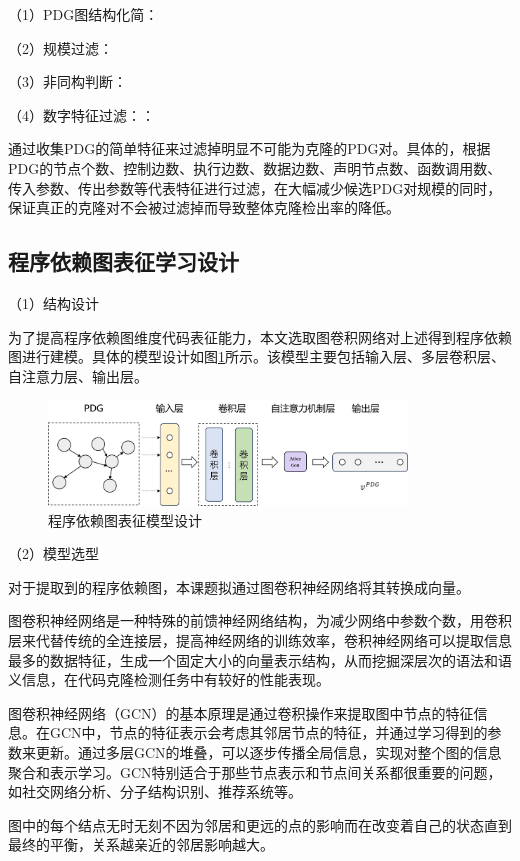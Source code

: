 （1）PDG图结构化简：

（2）规模过滤：

（3）非同构判断：

（4）数字特征过滤：：


通过收集PDG的简单特征来过滤掉明显不可能为克隆的PDG对。具体的，根据PDG的节点个数、控制边数、执行边数、数据边数、声明节点数、函数调用数、传入参数、传出参数等代表特征进行过滤，在大幅减少候选PDG对规模的同时，保证真正的克隆对不会被过滤掉而导致整体克隆检出率的降低。


\subsection{程序依赖图表征学习设计}
\label{subsec:PDGModel}

（1）结构设计

为了提高程序依赖图维度代码表征能力，本文选取图卷积网络对上述得到程序依赖图进行建模。具体的模型设计如图\ref{fig:pdgmodel}所示。该模型主要包括输入层、多层卷积层、自注意力层、输出层。
\begin{figure}[H]
  \centering
  \includegraphics[width=0.85\textwidth]{figures/pdgmodel.png}
  \caption{程序依赖图表征模型设计}\label{fig:pdgmodel}
\end{figure}

（2）模型选型


对于提取到的程序依赖图，本课题拟通过图卷积神经网络将其转换成向量。


图卷积神经网络是一种特殊的前馈神经网络结构，为减少网络中参数个数，用卷积层来代替传统的全连接层，提高神经网络的训练效率，卷积神经网络可以提取信息最多的数据特征，生成一个固定大小的向量表示结构，从而挖掘深层次的语法和语义信息，在代码克隆检测任务中有较好的性能表现。

图卷积神经网络（GCN）的基本原理是通过卷积操作来提取图中节点的特征信息。在GCN中，节点的特征表示会考虑其邻居节点的特征，并通过学习得到的参数来更新。通过多层GCN的堆叠，可以逐步传播全局信息，实现对整个图的信息聚合和表示学习。GCN特别适合于那些节点表示和节点间关系都很重要的问题，如社交网络分析、分子结构识别、推荐系统等。


图中的每个结点无时无刻不因为邻居和更远的点的影响而在改变着自己的状态直到最终的平衡，关系越亲近的邻居影响越大。

